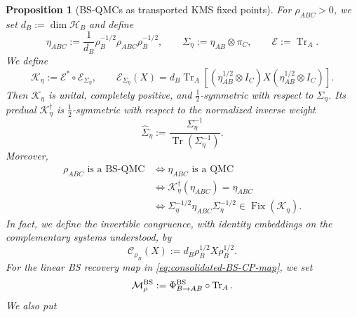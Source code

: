 \documentclass[11pt]{article}
\newtheorem{proposition}[proposition]{Proposition}
\theoremstyle{remark}
\newcommand{\1}{\mathbbm{1}}
\begin{document}
\begin{proposition}[BS-QMCs as transported KMS fixed points]
\label{prop:consolidated-BS-KMS-fixed-points}
For $\rho_{ABC}>0$, we set $d_B:=\dim\mathcal H_B$ and define
\begin{equation}
 \eta_{ABC}:=\frac1{d_B}\rho_B^{-1/2}\rho_{ABC}\rho_B^{-1/2},
 \qquad
 \Sigma_\eta:=\eta_{AB}\otimes\pi_C,
 \qquad
 \mathcal E:=\operatorname{Tr}_A.
 \label{eq:consolidated-BS-KMS-shadow}
\end{equation}
We define
\begin{equation}
 \mathcal K_\eta:=\mathcal E^*\circ\mathcal E_{\Sigma_\eta},
 \qquad
 \mathcal E_{\Sigma_\eta}(X)
 =d_B\operatorname{Tr}_A\!\left[
  (\eta_{AB}^{1/2}\otimes I_C)X
  (\eta_{AB}^{1/2}\otimes I_C)
 \right].
 \label{eq:consolidated-BS-KMS-reversibilization}
\end{equation}
Then $\mathcal K_\eta$ is unital, completely positive, and
$\frac12$-symmetric with respect to $\Sigma_\eta$.  Its predual
$\mathcal K_\eta^\dagger$ is $\frac12$-symmetric with respect to the
normalized inverse weight
\begin{equation}
 \widehat\Sigma_\eta
 :=\frac{\Sigma_\eta^{-1}}{\operatorname{Tr}(\Sigma_\eta^{-1})}.
 \label{eq:consolidated-inverse-KMS-weight}
\end{equation}
Moreover,
\begin{equation}
 \boxed{
 \begin{aligned}
 \rho_{ABC}\text{ is a BS-QMC}
 &\Longleftrightarrow \eta_{ABC}\text{ is a QMC}\\
 &\Longleftrightarrow
 \mathcal K_\eta^\dagger(\eta_{ABC})=\eta_{ABC}\\
 &\Longleftrightarrow
 \Sigma_\eta^{-1/2}\eta_{ABC}\Sigma_\eta^{-1/2}
 \in\operatorname{Fix}(\mathcal K_\eta).
 \end{aligned}}
 \label{eq:consolidated-BS-KMS-equivalence}
\end{equation}
In fact, we define the invertible congruence, with identity embeddings
on the complementary systems understood, by
\begin{equation}
 \mathcal C_{\rho_B}(X):=d_B\rho_B^{1/2}X\rho_B^{1/2}.
\end{equation}
For the linear BS recovery map in
\eqref{eq:consolidated-BS-CP-map}, we set
\begin{equation}
 \mathcal M_\rho^{\rm BS}
 :=\Phi_{B\to AB}^{\rm BS}\circ\operatorname{Tr}_A.
 \label{eq:consolidated-BS-fixed-point-map}
\end{equation}
We also put
\begin{equation}

\end{equation}
\end{proposition}
\end{document}
